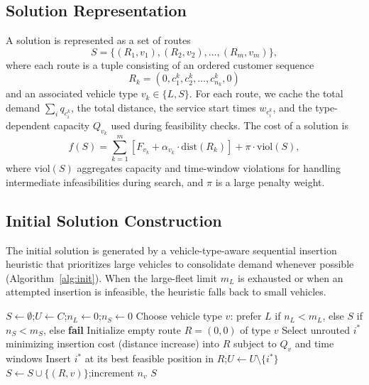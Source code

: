\documentclass[11pt]{article}
\begin{document}
\subsection{Solution Representation}

A solution is represented as a set of routes
\begin{equation}
S = \{(R_1, v_1), (R_2, v_2), \ldots, (R_m, v_m)\},
\end{equation}
where each route is a tuple consisting of an ordered customer sequence
\begin{equation}
R_k = (0, c_1^k, c_2^k, \ldots, c_{n_k}^k, 0)
\end{equation}
and an associated vehicle type $v_k \in \{L, S\}$. For each route, we cache the total demand $\sum_i q_{c_i^k}$, the total distance, the service start times $w_{c_i^k}$, and the type-dependent capacity $Q_{v_k}$ used during feasibility checks. The cost of a solution is
\begin{equation}
f(S) = \sum_{k=1}^m \left[ F_{v_k} + \alpha_{v_k} \cdot \mathrm{dist}(R_k) \right] + \pi \cdot \mathrm{viol}(S),
\end{equation}
where $\mathrm{viol}(S)$ aggregates capacity and time-window violations for handling intermediate infeasibilities during search, and $\pi$ is a large penalty weight.

\subsection{Initial Solution Construction}

The initial solution is generated by a vehicle-type-aware sequential insertion heuristic that prioritizes large vehicles to consolidate demand whenever possible (Algorithm~\ref{alg:init}). When the large-fleet limit $m_L$ is exhausted or when an attempted insertion is infeasible, the heuristic falls back to small vehicles.

\begin{algorithm}[H]
\caption{Vehicle-Type-Aware Sequential Insertion}
\label{alg:init}
\begin{algorithmic}[1]
\STATE $S \gets \emptyset$;\quad $U \gets C$;\quad $n_L \gets 0$;\quad $n_S \gets 0$
    \STATE Choose vehicle type $v$: prefer $L$ if $n_L < m_L$, else $S$ if $n_S < m_S$, else \textbf{fail}
    \STATE Initialize empty route $R = (0, 0)$ of type $v$
        \STATE Select unrouted $i^*$ minimizing insertion cost (distance increase) into $R$ subject to $Q_v$ and time windows
        \STATE Insert $i^*$ at its best feasible position in $R$;\quad $U \gets U \setminus \{i^*\}$
    \ENDWHILE
    \STATE $S \gets S \cup \{(R, v)\}$;\quad increment $n_v$
\ENDWHILE
\RETURN $S$
\end{algorithmic}
\end{algorithm}
\end{document}
